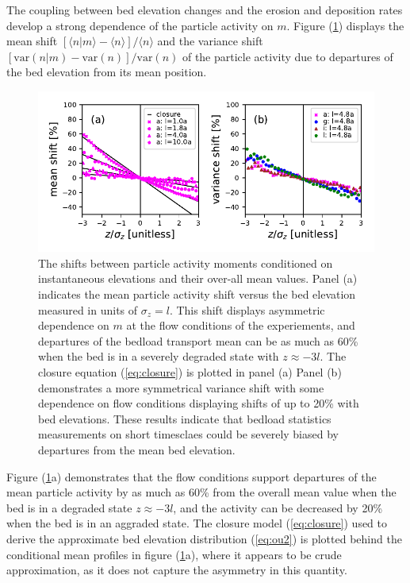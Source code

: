 The coupling between bed elevation changes and the erosion and deposition rates develop a strong dependence of the particle activity on $m$. Figure (\ref{fig:condmoms}) displays the mean shift $[\langle n |m \rangle - \langle n \rangle]/\langle n \rangle $ and the variance shift  $[\text{var}(n|m) - \text{var}(n)]/\text{var}(n)$ of the particle activity due to departures of the bed elevation from its mean position.
\begin{figure}[!htbp]
	\includegraphics[width=\linewidth,keepaspectratio]{./figures/ch3/momentsuppression.pdf}
	\caption{The shifts between particle activity moments conditioned on instantaneous elevations and their over-all mean values. Panel (a) indicates the mean particle activity shift versus the bed elevation measured in units of $\sigma_z=l$. This shift displays asymmetric dependence on $m$ at the flow conditions of the \citet{Ancey2008} experiements, and departures of the bedload transport mean can be as much as 60\% when the bed is in a severely degraded state with $z\approx -3l$. The closure equation (\ref{eq:closure}) is plotted in panel (a) Panel (b) demonstrates a more symmetrical variance shift with some dependence on flow conditions displaying shifts of up to 20\% with bed elevations. These results indicate that bedload statistics measurements on short timesclaes could be severely biased by departures from the mean bed elevation.}
	\label{fig:condmoms}
\end{figure}
Figure (\ref{fig:condmoms}a) demonstrates that the \citet{Ancey2008} flow conditions support departures of the mean particle activity by as much as 60\% from the overall mean value when the bed is in a degraded state $z\approx -3l$, and the activity can be decreased by 20\% when the bed is in an aggraded state.
The closure model (\ref{eq:closure}) used to derive the approximate bed elevation distribution (\ref{eq:ou2}) is plotted behind the conditional mean profiles in figure (\ref{fig:condmoms}a), where it appears to be crude approximation, as it does not capture the asymmetry in this quantity.
